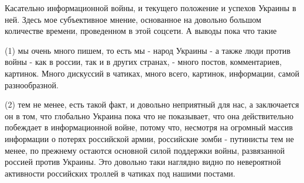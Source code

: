 Касательно информационной войны, и текущего положение и успехов Украины в ней.
Здесь мое субъективное мнение, основанное на довольно большом количестве
времени, проведенном в этой соцсети. А выводы пока что такие

(1) мы очень много пишем, то есть мы - народ Украины - а также люди против
войны - как в россии, так и в других странах, - много постов, комментариев,
картинок. Много дискуссий в чатиках, много всего, картинок, информации, самой
разнообразной.

(2) тем не менее, есть такой факт, и довольно неприятный для нас, а заключается
он в том, что глобально Украина пока что не показывает, что она действительно
побеждает в информационной войне, потому что, несмотря на огромный массив
информации о потерях российской армии, российские зомби - путинисты тем не
менее, по прежнему остаются основной силой поддержки войны, развязанной россией
против Украины. Это довольно таки наглядно видно по невероятной активности
российских троллей в чатиках под нашими постами. 

